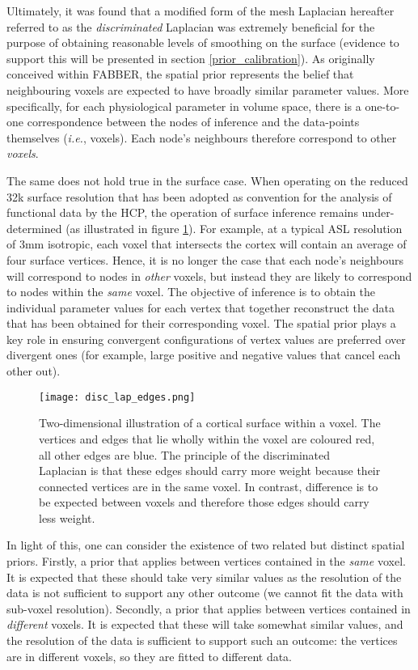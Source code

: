 Ultimately, it was found that a modified form of the mesh Laplacian hereafter referred to as the \textit{discriminated} Laplacian was extremely beneficial for the purpose of obtaining reasonable levels of smoothing on the surface (evidence to support this will be presented in section \ref{prior_calibration}). As originally conceived within FABBER, the spatial prior represents the belief that neighbouring voxels are expected to have broadly similar parameter values. More specifically, for each physiological parameter in volume space, there is a one-to-one correspondence between the nodes of inference and the data-points themselves (\textit{i.e.}, voxels). Each node's neighbours therefore correspond to other \textit{voxels}. 

The same does not hold true in the surface case. When operating on the reduced 32k surface resolution that has been adopted as convention for the analysis of functional data by the HCP, the operation of surface inference remains under-determined (as illustrated in figure \ref{disc_lap_edges}). For example, at a typical ASL resolution of 3mm isotropic, each voxel that intersects the cortex will contain an average of four surface vertices. Hence, it is no longer the case that each node's neighbours will correspond to nodes in \textit{other} voxels, but instead they are likely to correspond to nodes within the \textit{same} voxel. The objective of inference is to obtain the individual parameter values for each vertex that together reconstruct the data that has been obtained for their corresponding voxel. The spatial prior plays a key role in ensuring convergent configurations of vertex values are preferred over divergent ones (for example, large positive and negative values that cancel each other out). 

\begin{figure}
\centering
\texttt{[image: disc\_lap\_edges.png]}
\caption{Two-dimensional illustration of a cortical surface within a voxel. The vertices and edges that lie wholly within the voxel are coloured red, all other edges are blue. The principle of the discriminated Laplacian is that these edges should carry more weight because their connected vertices are in the same voxel. In contrast, difference is to be expected between voxels and therefore those edges should carry less weight.}
\label{disc_lap_edges} 
\end{figure}

In light of this, one can consider the existence of two related but distinct spatial priors. Firstly, a prior that applies between vertices contained in the \textit{same} voxel. It is expected that these should take very similar values as the resolution of the  data is not sufficient to support any other outcome (we cannot fit the data with sub-voxel resolution). Secondly, a prior that applies between vertices contained in \textit{different} voxels. It is expected that these will take somewhat similar values, and the resolution of the data is sufficient to support such an outcome: the vertices are in different voxels, so they are fitted to different data. 


